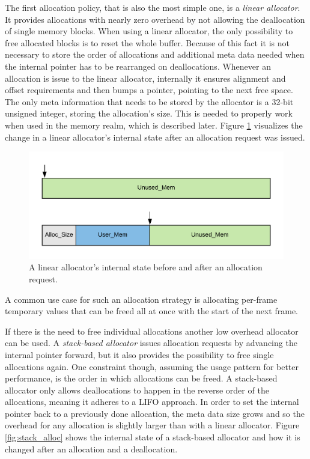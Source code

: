 The first allocation policy, that is also the most simple one, is a \textit{linear allocator}. It provides allocations with nearly zero overhead by not allowing the deallocation of single memory blocks. When using a linear allocator, the only possibility to free allocated blocks is to reset the whole buffer. Because of this fact it is not necessary to store the order of allocations and additional meta data needed when the internal pointer has to be rearranged on deallocations. Whenever an allocation is issue to the linear allocator, internally it ensures alignment and offset requirements and then bumps a pointer, pointing to the next free space. The only meta information that needs to be stored by the allocator is a 32-bit unsigned integer, storing the allocation's size. This is needed to properly work when used in the memory realm, which is described later. Figure \ref{fig:linear_alloc} visualizes the change in a linear allocator's internal state after an allocation request was issued.

\begin{figure}[h!]
	\centering \includegraphics[width=\linewidth]{PICs/linear_alloc.png}
	\caption{A linear allocator's internal state before and after an allocation request.}
	\label{fig:linear_alloc}
\end{figure}

\noindent
A common use case for such an allocation strategy is allocating per-frame temporary values that can be freed all at once with the start of the next frame. 

If there is the need to free individual allocations another low overhead allocator can be used. A \textit{stack-based allocator} issues allocation requests by advancing the internal pointer forward, but it also provides the possibility to free single allocations again. One constraint though, assuming the usage pattern for better performance, is the order in which allocations can be freed. A stack-based allocator only allows deallocations to happen in the reverse order of the allocations, meaning it adheres to a \ac{LIFO} approach. In order to set the internal pointer back to a previously done allocation, the meta data size grows and so the overhead for any allocation is slightly larger than with a linear allocator. Figure \ref{fig:stack_alloc} shows the internal state of a stack-based allocator and how it is changed after an allocation and a deallocation.

